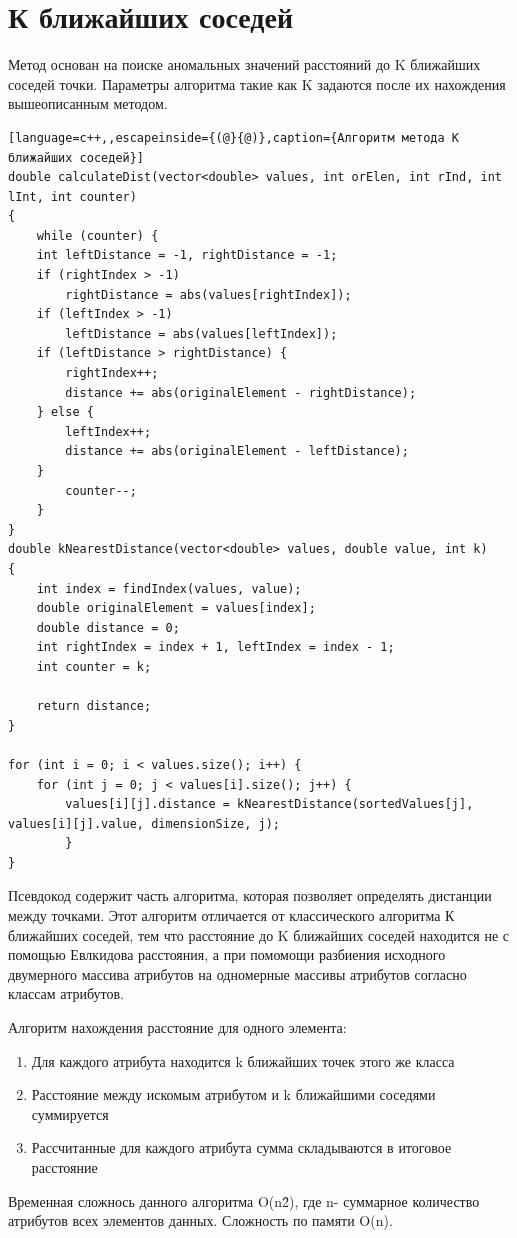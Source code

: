 \section{К ближайших соседей}
Метод основан на поиске аномальных значений расстояний до K ближайших соседей точки. Параметры алгоритма такие как K задаются после их нахождения вышеописанным методом.
\begin{lstlisting}[language=c++,,escapeinside={(@}{@)},caption={Алгоритм метода К ближайших соседей}] 
double calculateDist(vector<double> values, int orElen, int rInd, int lInt, int counter)
{
	while (counter) {
	int leftDistance = -1, rightDistance = -1;
	if (rightIndex > -1)
		rightDistance = abs(values[rightIndex]);
	if (leftIndex > -1)
		leftDistance = abs(values[leftIndex]);
	if (leftDistance > rightDistance) {
		rightIndex++;
		distance += abs(originalElement - rightDistance);
	} else {
		leftIndex++;
		distance += abs(originalElement - leftDistance);
	}
		counter--;
	}
}
double kNearestDistance(vector<double> values, double value, int k)
{
	int index = findIndex(values, value);
	double originalElement = values[index];
	double distance = 0;
	int rightIndex = index + 1, leftIndex = index - 1;
	int counter = k;

	return distance;
}

for (int i = 0; i < values.size(); i++) {
	for (int j = 0; j < values[i].size(); j++) {
		values[i][j].distance = kNearestDistance(sortedValues[j], values[i][j].value, dimensionSize, j);
		}
}
\end{lstlisting}
Псевдокод содержит часть алгоритма, которая позволяет определять дистанции между точками. Этот алгоритм отличается от классического алгоритма К ближайших соседей, тем что расстояние до K ближайших соседей находится не с помощью Евлкидова расстояния, а при помомощи разбиения исходного двумерного массива атрибутов на одномерные массивы атрибутов согласно классам атрибутов.

 Алгоритм нахождения расстояние для одного элемента:
 
\begin{enumerate}
	\item Для каждого атрибута находится k ближайших точек этого же класса
	\item Расстояние между искомым атрибутом и k ближайшими соседями суммируется
	\item Рассчитанные для каждого атрибута сумма складываются в итоговое расстояние
\end{enumerate}
Временная сложнось данного алгоритма O(n\^2), где n- суммарное количество атрибутов всех элементов данных. Сложность по памяти O(n).
